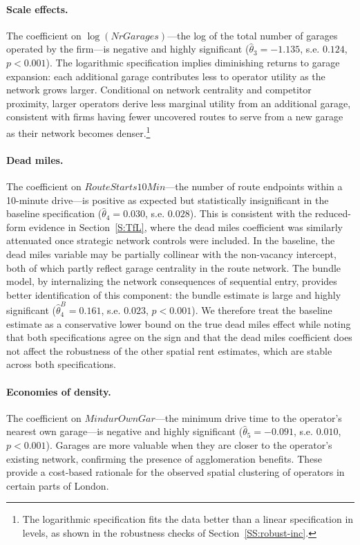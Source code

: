 \documentclass[12pt]{article}
\begin{document}
\paragraph{Scale effects.} The coefficient on $\log(\textit{NrGarages})$---the 
log of the total number of garages operated by the firm---is negative and 
highly significant ($\hat{\theta}_3 = -1.135$, s.e. $0.124$, $p<0.001$). 
The logarithmic specification implies diminishing returns to garage expansion: 
each additional garage contributes less to operator utility as the network 
grows larger. Conditional on network centrality and competitor proximity, 
larger operators derive less marginal utility from an additional garage, 
consistent with firms having fewer uncovered routes to serve from a new 
garage as their network becomes denser.\footnote{The logarithmic specification fits the data better than a linear 
specification in levels, as shown in the robustness checks of 
Section~\ref{SS:robust-inc}.}


\paragraph{Dead miles.} The coefficient on $\textit{RouteStarts10Min}$---the 
number of route endpoints within a 10-minute drive---is positive as expected 
but statistically insignificant in the baseline specification 
($\hat{\theta}_4 = 0.030$, s.e. $0.028$). This is consistent with the 
reduced-form evidence in Section~\ref{S:TfL}, where the dead miles 
coefficient was similarly attenuated once strategic network controls were 
included. In the baseline, the dead miles variable may be partially collinear 
with the non-vacancy intercept, both of which partly reflect garage centrality 
in the route network. The bundle model, by internalizing the network 
consequences of sequential entry, provides better identification of this 
component: the bundle estimate is large and highly significant 
($\hat{\theta}_4^B = 0.161$, s.e. $0.023$, $p<0.001$). We therefore treat the 
baseline estimate as a conservative lower bound on the true dead miles 
effect while noting that both specifications agree on the sign and that the 
dead miles coefficient does not affect the robustness of the other spatial 
rent estimates, which are stable across both specifications.

\paragraph{Economies of density.} The coefficient on 
$\textit{MindurOwnGar}$---the minimum drive time to the operator's nearest 
own garage---is negative and highly significant ($\hat{\theta}_5 = -0.091$, 
s.e. $0.010$, $p<0.001$). Garages are more valuable when they are closer to 
the operator's existing network, confirming the presence of agglomeration 
benefits. These provide a cost-based rationale for the observed spatial 
clustering of operators in certain parts of London.
\end{document}

